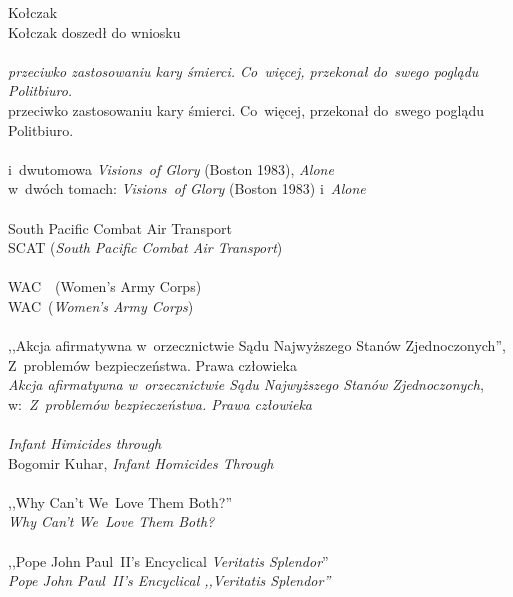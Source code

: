 \documentclass[a4paper,11pt]{article}
\begin{document}
\Jest Kołczak \\
\Pow  Kołczak doszedł do wniosku \\
 \\
\Jest \emph{przeciwko zastosowaniu kary śmierci. Co~więcej,
  przekonał do~swego poglądu Politbiuro.} \\
\Pow przeciwko zastosowaniu kary śmierci. Co~więcej, przekonał
do~swego poglądu Politbiuro. \\
 \\
\Jest i~dwutomowa \emph{Visions~of Glory} (Boston 1983), \emph{Alone} \\
\Pow w~dwóch tomach: \emph{Visions~of Glory} (Boston 1983)
i~\emph{Alone} \\
 \\
\Jest South Pacific Combat Air Transport \\
\Pow SCAT (\emph{South Pacific Combat Air Transport}) \\
 \\
\Jest WAC~~(Women's Army Corps) \\
\Pow WAC~(\emph{Women's Army Corps}) \\
 \\
\Jest ,,Akcja afirmatywna w~orzecznictwie Sądu Najwyższego Stanów
Zjednoczonych'', Z~problemów bezpieczeństwa. Prawa człowieka \\
\Pow \emph{Akcja afirmatywna w~orzecznictwie Sądu Najwyższego Stanów
  Zjednoczonych}, w:~\emph{Z~problemów bezpieczeństwa. Prawa człowieka} \\
 \\
\Jest \emph{Infant Himicides through} \\
\Pow Bogomir Kuhar, \emph{Infant Homicides Through} \\
 \\
\Jest ,,Why Can't We~Love Them Both?'' \\
\Pow \emph{Why Can't We~Love Them Both?} \\
 \\
\Jest ,,Pope John Paul~II's Encyclical \emph{Veritatis Splendor}'' \\
\Pow \emph{Pope John Paul~II's Encyclical ,,Veritatis Splendor''} \\

\vspace{\spaceTwo}





\end{document}
